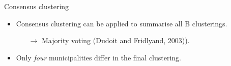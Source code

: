 \documentclass[9pt]{beamer}
\begin{document}
\begin{frame}[t]{Consensus clustering}

\begin{itemize}
\item Consensus clustering can be applied to summarise all B clusterings. 
\begin{itemize}\item[$\rightarrow$] Majority voting (Dudoit and Fridlyand, 2003)).\end{itemize}
\item<4> Only \emph{four} municipalities differ in the final clustering.
\end{itemize}

\begin{columns}
\begin{column}{0.5\textwidth}
\begin{figure}\vspace{-0.20cm}%

\end{figure}
\end{column}
\end{columns}
\end{frame}
\end{document}
